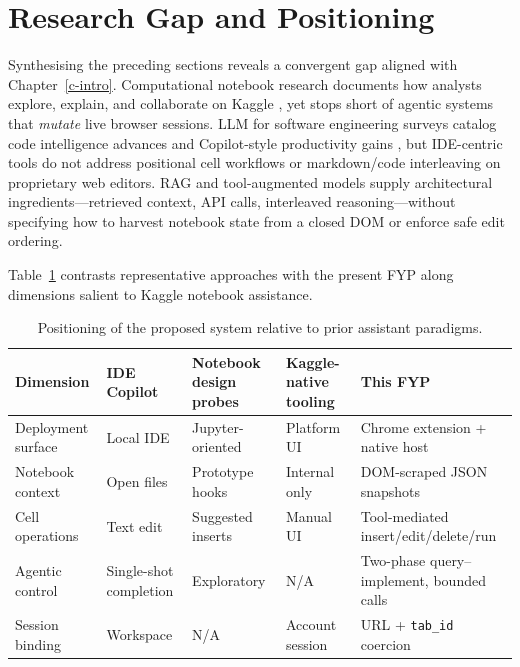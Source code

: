 \section{Research Gap and Positioning}
\label{sec:lit-gap}

Synthesising the preceding sections reveals a convergent gap aligned with Chapter~\ref{c-intro}. Computational notebook research documents how analysts explore, explain, and collaborate on Kaggle \parencite{rule2018exploration,wang2021welldocumented,quaranta2022bestpractices}, yet stops short of agentic systems that \emph{mutate} live browser sessions. \ac{LLM} for software engineering surveys catalog code intelligence advances \parencite{hou2024llm4se} and Copilot-style productivity gains \parencite{ziegler2024copilot}, but IDE-centric tools do not address positional cell workflows or markdown/code interleaving on proprietary web editors. \ac{RAG} and tool-augmented models \parencite{lewis2020rag,schick2023toolformer,yao2023react,qin2024toolllm} supply architectural ingredients---retrieved context, API calls, interleaved reasoning---without specifying how to harvest notebook state from a closed \ac{DOM} or enforce safe edit ordering.

Table~\ref{tab:positioning} contrasts representative approaches with the present FYP along dimensions salient to Kaggle notebook assistance.

\begin{table}[!ht]
\centering
\caption{Positioning of the proposed system relative to prior assistant paradigms.}
\label{tab:positioning}
\small
\begin{tabular}{|p{2.4cm}|p{2.6cm}|p{2.6cm}|p{2.6cm}|p{2.4cm}|}
\hline
\textbf{Dimension} & \textbf{IDE Copilot} \parencite{ziegler2024copilot} & \textbf{Notebook design probes} \parencite{mcnutt2023notebookassistants} & \textbf{Kaggle-native tooling} & \textbf{This FYP} \\ \hline
Deployment surface & Local IDE & Jupyter-oriented & Platform UI & Chrome extension + native host \\ \hline
Notebook context & Open files & Prototype hooks & Internal only & DOM-scraped JSON snapshots \\ \hline
Cell operations & Text edit & Suggested inserts & Manual UI & Tool-mediated insert/edit/delete/run \\ \hline
Agentic control & Single-shot completion & Exploratory & N/A & Two-phase query--implement, bounded calls \\ \hline
Session binding & Workspace & N/A & Account session & URL + \texttt{tab\_id} coercion \\ \hline
\end{tabular}
\end{table}

